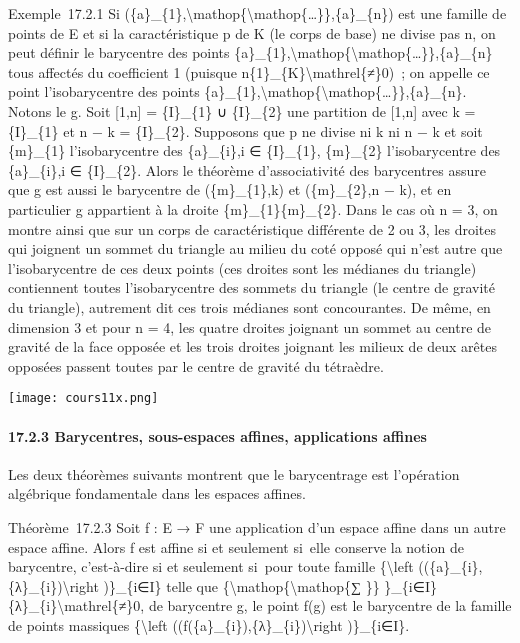 \documentclass[]{article}
\begin{document}
Exemple~17.2.1 Si
(\{a\}\_\{1\},\textbackslash{}mathop\{\textbackslash{}mathop\{\ldots{}\}\},\{a\}\_\{n\})
est une famille de points de E et si la caractéristique p de K (le corps
de base) ne divise pas n, on peut définir le barycentre des points
\{a\}\_\{1\},\textbackslash{}mathop\{\textbackslash{}mathop\{\ldots{}\}\},\{a\}\_\{n\}
tous affectés du coefficient 1 (puisque
n\{1\}\_\{K\}\textbackslash{}mathrel\{≠\}0)~; on appelle ce point
l'isobarycentre des points
\{a\}\_\{1\},\textbackslash{}mathop\{\textbackslash{}mathop\{\ldots{}\}\},\{a\}\_\{n\}.
Notons le g. Soit {[}1,n{]} = \{I\}\_\{1\} ∪ \{I\}\_\{2\} une partition
de {[}1,n{]} avec k = \textbar{}\{I\}\_\{1\}\textbar{} et n − k =
\textbar{}\{I\}\_\{2\}\textbar{}. Supposons que p ne divise ni k ni n −
k et soit \{m\}\_\{1\} l'isobarycentre des \{a\}\_\{i\},i ∈
\{I\}\_\{1\}, \{m\}\_\{2\} l'isobarycentre des \{a\}\_\{i\},i ∈
\{I\}\_\{2\}. Alors le théorème d'associativité des barycentres assure
que g est aussi le barycentre de (\{m\}\_\{1\},k) et (\{m\}\_\{2\},n −
k), et en particulier g appartient à la droite \{m\}\_\{1\}\{m\}\_\{2\}.
Dans le cas où n = 3, on montre ainsi que sur un corps de
caractéristique différente de 2 ou 3, les droites qui joignent un sommet
du triangle au milieu du coté opposé qui n'est autre que l'isobarycentre
de ces deux points (ces droites sont les médianes du triangle)
contiennent toutes l'isobarycentre des sommets du triangle (le centre de
gravité du triangle), autrement dit ces trois médianes sont
concourantes. De même, en dimension 3 et pour n = 4, les quatre droites
joignant un sommet au centre de gravité de la face opposée et les trois
droites joignant les milieux de deux arêtes opposées passent toutes par
le centre de gravité du tétraèdre.

\texttt{[image: cours11x.png]}

\paragraph{17.2.3 Barycentres, sous-espaces affines, applications
affines}

Les deux théorèmes suivants montrent que le barycentrage est l'opération
algébrique fondamentale dans les espaces affines.

Théorème~17.2.3 Soit f : E → F une application d'un espace affine dans
un autre espace affine. Alors f est affine si et seulement si~elle
conserve la notion de barycentre, c'est-à-dire si et seulement si~pour
toute famille \{\textbackslash{}left
((\{a\}\_\{i\},\{λ\}\_\{i\})\textbackslash{}right )\}\_\{i∈I\} telle que
\{\textbackslash{}mathop\{\textbackslash{}mathop\{∑ \}\}
\}\_\{i∈I\}\{λ\}\_\{i\}\textbackslash{}mathrel\{≠\}0, de barycentre g,
le point f(g) est le barycentre de la famille de points massiques
\{\textbackslash{}left
((f(\{a\}\_\{i\}),\{λ\}\_\{i\})\textbackslash{}right )\}\_\{i∈I\}.
\end{document}
